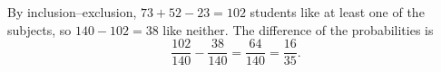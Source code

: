 By inclusion--exclusion, $73+52-23=102$ students like at least one of the subjects, so $140-102=38$ like neither. The difference of the probabilities is
\[
\dfrac{102}{140}-\dfrac{38}{140}=\dfrac{64}{140}=\boxed{\dfrac{16}{35}} .
\]
